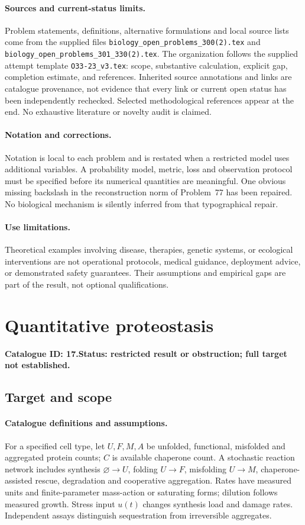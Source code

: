 \documentclass[11pt]{article}
\begin{document}
\paragraph{Sources and current-status limits.}
Problem statements, definitions, alternative formulations and local source lists
come from the supplied files
\texttt{biology\_open\_problems\_300(2).tex} and
\texttt{biology\_open\_problems\_301\_330(2).tex}.
The organization follows the supplied attempt template
\texttt{O33-23\_v3.tex}: scope, substantive calculation, explicit gap,
completion estimate, and references. Inherited source annotations and links are
catalogue provenance, not evidence that every link or current open status has
been independently rechecked. Selected methodological references appear at the
end. No exhaustive literature or novelty audit is claimed.

\paragraph{Notation and corrections.}
Notation is local to each problem and is restated when a restricted model uses
additional variables. A probability model, metric, loss and observation protocol
must be specified before its numerical quantities are meaningful. One obvious
missing backslash in the reconstruction norm of Problem~77 has been repaired.
No biological mechanism is silently inferred from that typographical repair.

\paragraph{Use limitations.}
Theoretical examples involving disease, therapies, genetic systems, or ecological
interventions are not operational protocols, medical guidance, deployment advice,
or demonstrated safety guarantees. Their assumptions and empirical gaps are part
of the result, not optional qualifications.

\setcounter{section}{16}
\section{Quantitative proteostasis}
\label{prob:017}
\noindent\textbf{Catalogue ID: 17.}\quad \textbf{Status: restricted result or obstruction; full target not established.}
\subsection{Target and scope}
\paragraph{Catalogue definitions and assumptions.}
For a specified cell type, let $U,F,M,A$ be unfolded, functional, misfolded and aggregated protein counts; $C$ is available chaperone count. A stochastic reaction network includes synthesis $\varnothing\to U$, folding $U\to F$, misfolding $U\to M$, chaperone-assisted rescue, degradation and cooperative aggregation. Rates have measured units and finite-parameter mass-action or saturating forms; dilution follows measured growth. Stress input $u(t)$ changes synthesis load and damage rates. Independent assays distinguish sequestration from irreversible aggregates.
\end{document}
